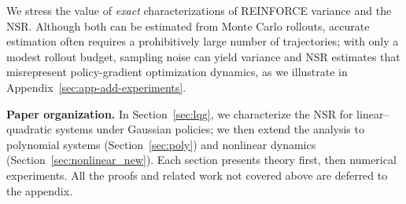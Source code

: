 \vspace{-1mm}
We stress the value of \emph{exact} characterizations of REINFORCE variance and the NSR. Although both can be estimated from Monte Carlo rollouts, accurate estimation often requires a prohibitively large number of trajectories; with only a modest rollout budget, sampling noise can yield variance and NSR estimates that misrepresent policy-gradient optimization dynamics, as we illustrate in Appendix~\ref{sec:app-add-experiments}.

\vspace{-1mm}
\textbf{Paper organization.}
In Section~\ref{sec:lqg}, we characterize the NSR for linear--quadratic systems under Gaussian policies; we then extend the analysis to polynomial systems (Section~\ref{sec:poly}) and nonlinear dynamics (Section~\ref{sec:nonlinear_new}). Each section presents theory first, then numerical experiments.
All the proofs and related work not covered above are deferred to the appendix.





